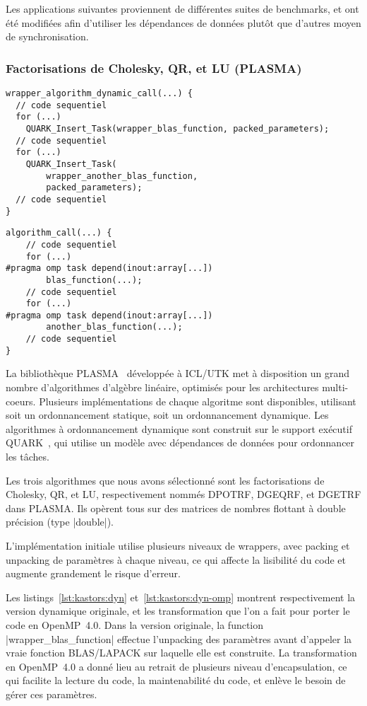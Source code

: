 Les applications suivantes proviennent de différentes suites de benchmarks, et ont été modifiées afin d'utiliser les dépendances de données plutôt que d'autres moyen de synchronisation.

\subsubsection{Factorisations de Cholesky, QR, et LU (PLASMA)}

\begin{lstlisting}[caption=Format de l'algorithme dynamique,label=lst:kastors:dyn]
wrapper_algorithm_dynamic_call(...) {
  // code sequentiel
  for (...)
    QUARK_Insert_Task(wrapper_blas_function, packed_parameters);
  // code sequentiel
  for (...)
    QUARK_Insert_Task(
        wrapper_another_blas_function,
        packed_parameters);
  // code sequentiel
}
\end{lstlisting}
\begin{lstlisting}[caption=Format de l'algorithme OpenMP,label=lst:kastors:dyn-omp]
algorithm_call(...) {
    // code sequentiel
    for (...)
#pragma omp task depend(inout:array[...])
        blas_function(...);
    // code sequentiel
    for (...)
#pragma omp task depend(inout:array[...])
        another_blas_function(...);
    // code sequentiel
}
\end{lstlisting}

La bibliothèque PLASMA~\cite{Kurzak2013} développée à ICL/UTK met à disposition un grand nombre d'algorithmes d'algèbre linéaire, optimisés pour les architectures multi-coeurs.
Plusieurs implémentations de chaque algoritme sont disponibles, utilisant soit un ordonnancement statique, soit un ordonnancement dynamique.
Les algorithmes à ordonnancement dynamique sont construit sur le support exécutif QUARK~\cite{YarKhan2011}, qui utilise un modèle avec dépendances de données pour ordonnancer les tâches.

Les trois algorithmes que nous avons sélectionné sont les factorisations de Cholesky, QR, et LU, respectivement nommés DPOTRF, DGEQRF, et DGETRF dans PLASMA.
Ils opèrent tous sur des matrices de nombres flottant à double précision (type |double|).

L'implémentation initiale utilise plusieurs niveaux de wrappers, avec packing et unpacking de paramètres à chaque niveau, ce qui affecte la lisibilité du code et augmente grandement le risque d'erreur.

Les listings~\ref{lst:kastors:dyn} et~\ref{lst:kastors:dyn-omp} montrent respectivement la version dynamique originale, et les transformation que l'on a fait pour porter le code en OpenMP~4.0.
Dans la version originale, la function |wrapper_blas_function| effectue l'unpacking des paramètres avant d'appeler la vraie fonction BLAS/LAPACK sur laquelle elle est construite.
La transformation en OpenMP~4.0 a donné lieu au retrait de plusieurs niveau d'encapsulation, ce qui facilite la lecture du code, la maintenabilité du code, et enlève le besoin de gérer ces paramètres.


